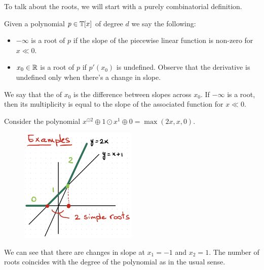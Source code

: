 \documentclass[12pt]{memoir}
\theoremstyle{definition}
\begin{document}
To talk about the roots, we will start with a purely combinatorial definition. 

\begin{Def}
    Given a polynomial $p\in\mathbb{T}[x]$ of degree $d$ we say the following:
    \begin{itemize}
        \item $-\infty$ is a root of $p$ if the slope of the piecewise linear function is non-zero for $x\ll 0$.
        \item $x_0\in\mathbb{R}$ is a root of $p$ if $p'(x_0)$ is undefined. Observe that the derivative is undefined only when there's a change in slope.
    \end{itemize}
    We say that the  of $x_0$ is the difference between slopes across $x_0$. If $-\infty$ is a root, then its multiplicity is equal to the slope of the associated function for $x\ll 0$.
\end{Def}

\begin{Ex}
    Consider the polynomial $x^{\odot2}\oplus1\odot x^1\oplus 0=\max(2x,x,0)$.
    \begin{figure}[h!]
        \centering
        \includegraphics[width=0.5\textwidth]{figs/fig3-3SimpleFiniteRootsTropicalPolynomial.png}
        \label{fig:3.3-SimpleFiniteRoots}
    \end{figure}
    We can see that there are changes in slope at $x_1=-1$ and $x_2=1$. The number of roots coincides with the degree of the polynomial as in the usual sense.
\end{Ex}
\end{document}

